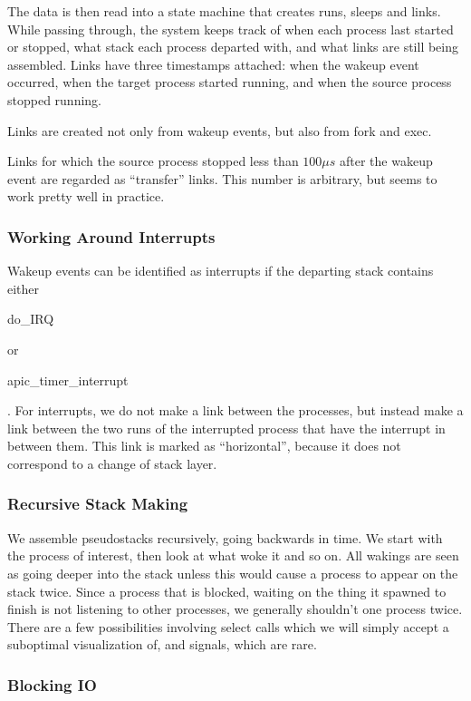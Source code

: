 \documentclass[10pt]{article}
\begin{document}
The data is then read into a  state machine that creates runs, sleeps and links.  While passing through, the system keeps track of when each process last started or stopped, what stack each process departed with, and what links are still being assembled.  Links have three timestamps attached: when the wakeup event occurred, when the target process started running, and when the source process stopped running.

Links are created not only from wakeup events, but also from fork and exec.

Links for which the source process stopped less than $100\mu s$ after the wakeup event are regarded as ``transfer'' links.  This number is arbitrary, but seems to work pretty well in practice.

\subsubsection{Working Around Interrupts}

Wakeup events can be identified as interrupts if the departing stack contains either \begin{tt}do\_IRQ\end{tt} or\\ \begin{tt}apic\_timer\_interrupt\end{tt}.  For interrupts, we do not make a link between the processes, but instead make a link between the two runs of the interrupted process that have the interrupt in between them.  This link is marked as ``horizontal'', because it does not correspond to a change of stack layer.

\subsubsection{Recursive Stack Making}

We assemble pseudostacks recursively, going backwards in time.  We start with the process of interest, then look at what woke it and so on.  All wakings are seen as going deeper into the stack unless this would cause a process to appear on the stack twice.  Since a process that is blocked, waiting on the thing it spawned to finish is not listening to other processes, we generally shouldn't one process twice.  There are a few possibilities involving select calls which we will simply accept a suboptimal visualization of, and signals, which are rare.

\subsubsection{Blocking IO}
\end{document}
